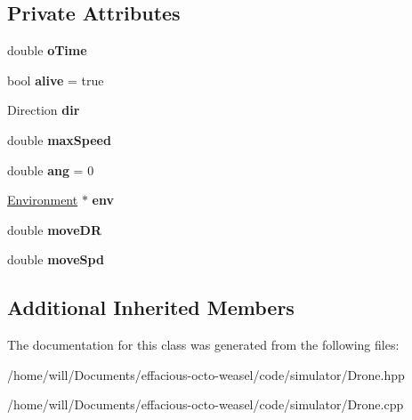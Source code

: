 \subsection*{Private Attributes}
\begin{DoxyCompactItemize}
\item 
double {\bfseries o\+Time}\hypertarget{class_drone_a58d0d1070b3339121051cb88c8edc5bf}{}\label{class_drone_a58d0d1070b3339121051cb88c8edc5bf}

\item 
bool {\bfseries alive} = true\hypertarget{class_drone_aea356a33311281ec16bba90066af5142}{}\label{class_drone_aea356a33311281ec16bba90066af5142}

\item 
Direction {\bfseries dir}\hypertarget{class_drone_a9489e36ee8f7c1c4f9ea1374fa2deed8}{}\label{class_drone_a9489e36ee8f7c1c4f9ea1374fa2deed8}

\item 
double {\bfseries max\+Speed}\hypertarget{class_drone_a9dcad921c51f4e7455ef79c16261404c}{}\label{class_drone_a9dcad921c51f4e7455ef79c16261404c}

\item 
double {\bfseries ang} = 0\hypertarget{class_drone_a88b4a0066796c01715b4313bf13f1468}{}\label{class_drone_a88b4a0066796c01715b4313bf13f1468}

\item 
\hyperlink{class_environment}{Environment} $\ast$ {\bfseries env}\hypertarget{class_drone_a283a1a6532801f59250478d20fa5392f}{}\label{class_drone_a283a1a6532801f59250478d20fa5392f}

\item 
double {\bfseries move\+DR}\hypertarget{class_drone_a1320892a8f0d71d63a36e23079f7d56c}{}\label{class_drone_a1320892a8f0d71d63a36e23079f7d56c}

\item 
double {\bfseries move\+Spd}\hypertarget{class_drone_a97270a4291d82a57331669171bd80bc1}{}\label{class_drone_a97270a4291d82a57331669171bd80bc1}

\end{DoxyCompactItemize}
\subsection*{Additional Inherited Members}


The documentation for this class was generated from the following files\+:\begin{DoxyCompactItemize}
\item 
/home/will/\+Documents/effacious-\/octo-\/weasel/code/simulator/Drone.\+hpp\item 
/home/will/\+Documents/effacious-\/octo-\/weasel/code/simulator/Drone.\+cpp\end{DoxyCompactItemize}
